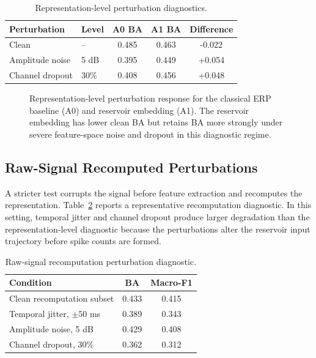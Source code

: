\begin{table}[t]
\caption{Representation-level perturbation diagnostics.}
\label{tab:repr_perturb}
\centering
\begin{tabular}{llccc}
\toprule
Perturbation & Level & A0 BA & A1 BA & Difference \\
\midrule
Clean & -- & 0.485 & 0.463 & -0.022 \\
Amplitude noise & 5 dB & 0.395 & 0.449 & +0.054 \\
Channel dropout & 30\% & 0.408 & 0.456 & +0.048 \\
\bottomrule
\end{tabular}
\end{table}

\begin{figure}[t]
\centering

\caption{Representation-level perturbation response for the classical ERP baseline (A0) and reservoir embedding (A1). The reservoir embedding has lower clean BA but retains BA more strongly under severe feature-space noise and dropout in this diagnostic regime.}
\label{fig:perturbation}
\end{figure}

\subsection{Raw-Signal Recomputed Perturbations}
A stricter test corrupts the signal before feature extraction and recomputes the representation. Table~\ref{tab:raw_perturb} reports a representative recomputation diagnostic. In this setting, temporal jitter and channel dropout produce larger degradation than the representation-level diagnostic because the perturbations alter the reservoir input trajectory before spike counts are formed.

\begin{table}[t]
\caption{Raw-signal recomputation perturbation diagnostic.}
\label{tab:raw_perturb}
\centering
\begin{tabular}{lcc}
\toprule
Condition & BA & Macro-F1 \\
\midrule
Clean recomputation subset & 0.433 & 0.415 \\
Temporal jitter, $\pm 50$ ms & 0.389 & 0.343 \\
Amplitude noise, 5 dB & 0.429 & 0.408 \\
Channel dropout, 30\% & 0.362 & 0.312 \\
\bottomrule
\end{tabular}
\end{table}
